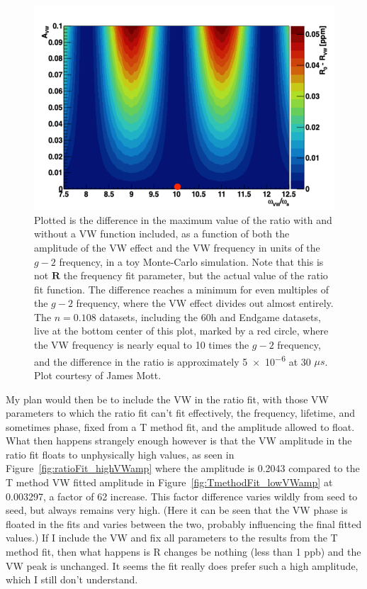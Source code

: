 \documentclass[12pt,letterpaper]{article}
\newcommand{\figref}[1]{Figure~\ref{#1}}
\def\gmtwo{$g-2$\xspace}
\begin{document}
\begin{figure}[]
    \centering
    \includegraphics[width=.8\textwidth]{VWRatioDiff}
    \caption[]{Plotted is the difference in the maximum value of the ratio with and without a VW function included, as a function of both the amplitude of the VW effect and the VW frequency in units of the \gmtwo frequency, in a toy Monte-Carlo simulation. Note that this is not $\boldsymbol{R}$ the frequency fit parameter, but the actual value of the ratio fit function. The difference reaches a minimum for even multiples of the \gmtwo frequency, where the VW effect divides out almost entirely. The $n = 0.108$ datasets, including the 60h and Endgame datasets, live at the bottom center of this plot, marked by a red circle, where the VW frequency is nearly equal to 10 times the \gmtwo frequency, and the difference in the ratio is approximately \SI{5e-6}{} at 30 $\mu s$. Plot courtesy of James Mott.}
    \label{fig:VWRatioDiff}
\end{figure}


My plan would then be to include the VW in the ratio fit, with those VW parameters to which the ratio fit can't fit effectively, the frequency, lifetime, and sometimes phase, fixed from a T method fit, and the amplitude allowed to float. What then happens strangely enough however is that the VW amplitude in the ratio fit floats to unphysically high values, as seen in \figref{fig:ratioFit_highVWamp} where the amplitude is 0.2043 compared to the T method VW fitted amplitude in \figref{fig:TmethodFit_lowVWamp} at 0.003297, a factor of 62 increase. This factor difference varies wildly from seed to seed, but always remains very high. (Here it can be seen that the VW phase is floated in the fits and varies between the two, probably influencing the final fitted values.) If I include the VW and fix all parameters to the results from the T method fit, then what happens is R changes be nothing (less than 1 ppb) and the VW peak is unchanged. It seems the fit really does prefer such a high amplitude, which I still don't understand.
\end{document}
